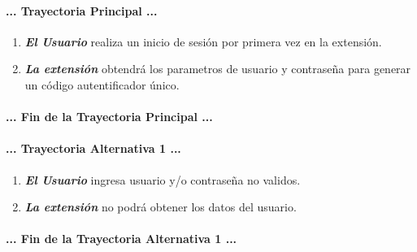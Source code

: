 \documentclass[12pt, a4paper, titlepage]{report}
\begin{document}
				\paragraph{... Trayectoria Principal ...}
				\begin{enumerate}
					\item \textbf{\textit{El Usuario}} realiza un inicio de sesión por primera vez en la extensión.
					\item \textbf{\textit{La extensión}} obtendrá los parametros de usuario y contraseña para generar un código autentificador único.
				\end{enumerate}
				\paragraph{... Fin de la Trayectoria Principal ...}
				
				\paragraph{... Trayectoria Alternativa 1 ...}
				\begin{enumerate}
					\item \textbf{\textit{El Usuario}} ingresa usuario y/o contraseña no validos.
					\item \textbf{\textit{La extensión}} no podrá obtener los datos del usuario.
				\end{enumerate}
				\paragraph{... Fin de la Trayectoria Alternativa 1 ...}
				
				\newpage
				
\end{document}

